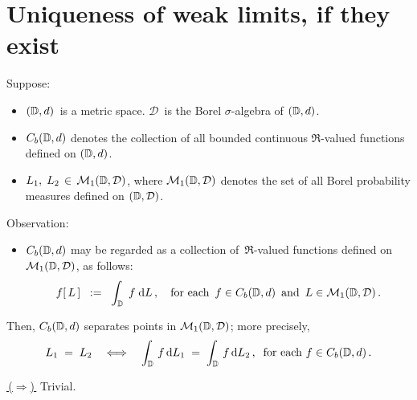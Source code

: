 

\section{Uniqueness of weak limits, if they exist}
\setcounter{theorem}{0}
\setcounter{equation}{0}


\renewcommand{\theenumi}{\roman{enumi}}
\renewcommand{\labelenumi}{\textnormal{(\theenumi)}$\;\;$}


\begin{theorem}
\mbox{}\vskip 0.1cm
\noindent
Suppose:
\begin{itemize}
\item
	$(\mathbb{D},d)$\, is a metric space.
	$\mathcal{D}$\, is the Borel $\sigma$-algebra of $(\mathbb{D},d)$.
\item
	$C_{b}(\mathbb{D},d)$ denotes the collection of all bounded continuous $\Re$-valued functions defined on $(\mathbb{D},d)$.
\item
	$L_{1},\; L_{2} \,\in\, \mathcal{M}_{1}(\mathbb{D},\mathcal{D})$,
	where $\mathcal{M}_{1}(\mathbb{D},\mathcal{D})$ denotes the set of
	all Borel probability measures defined on $(\mathbb{D},\mathcal{D})$.
\end{itemize}
Observation:
\begin{itemize}
\item
	$C_{b}(\mathbb{D},d)$ may be regarded as a collection of \,$\Re$-valued functions
	defined on $\mathcal{M}_{1}(\mathbb{D},\mathcal{D})$, as follows:
	\begin{equation*}
	f\!\left[\,L\,\right]
	\;\; := \;\;
		\int_{\mathbb{D}}\; f\;\textnormal{d} L\,,
	\quad
	\textnormal{for each \,$f \in C_{b}(\mathbb{D},d)$\, and \,$L \in \mathcal{M}_{1}(\mathbb{D},\mathcal{D})$}\,.
	\end{equation*}
\end{itemize}
Then, $C_{b}(\mathbb{D},d)$ separates points in $\mathcal{M}_{1}(\mathbb{D},\mathcal{D})$;
more precisely,
\begin{equation*}
L_{1} \; = \; L_{2}
\quad\Longleftrightarrow\quad
	\int_{\mathbb{D}}\, f \,\textnormal{d} L_{1} \;=\; \int_{\mathbb{D}}\, f \,\textnormal{d} L_{2}\,,
	\;\;
	\textnormal{for each $f \in C_{b}(\mathbb{D},d)$}\,.
\end{equation*}
\end{theorem}
\proof
\vskip 0.1cm
\noindent
\underline{\,($\Longrightarrow$)\,}\;\;
Trivial.


